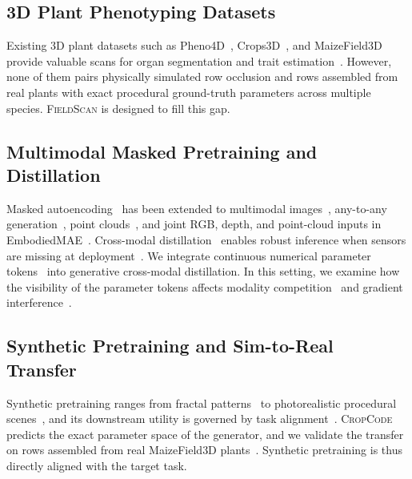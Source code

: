 \documentclass[10pt,twocolumn,letterpaper]{article}
\newcommand{\method}{\textup{\textsc{CropCode}}}   %
\newcommand{\dataset}{\textup{\textsc{FieldScan}}}
\begin{document}
\subsection{3D Plant Phenotyping Datasets}
Existing 3D plant datasets such as Pheno4D~\citep{schunck2021pheno4d}, Crops3D~\citep{crops3d2024}, and MaizeField3D~\citep{maizefield3d2025} provide valuable scans for organ segmentation and trait estimation~\citep{qi2017pointnet,qi2017pointnetpp,arshad2024nerf_field}. However, none of them pairs physically simulated row occlusion and rows assembled from real plants with exact procedural ground-truth parameters across multiple species. \dataset{} is designed to fill this gap.

\subsection{Multimodal Masked Pretraining and Distillation}
Masked autoencoding~\citep{he2022mae} has been extended to multimodal images~\citep{bachmann2022multimae}, any-to-any generation~\citep{mizrahi2023fourm,bachmann2024fourm21}, point clouds~\citep{pang2022pointmae}, and joint RGB, depth, and point-cloud inputs in EmbodiedMAE~\citep{dong2025embodiedmae}. Cross-modal distillation~\citep{hinton2015distillation} enables robust inference when sensors are missing at deployment~\citep{wang2024robustmissing}. We integrate continuous numerical parameter tokens~\citep{golkar2023xval} into generative cross-modal distillation. In this setting, we examine how the visibility of the parameter tokens affects modality competition~\citep{peng2022ogm} and gradient interference~\citep{yu2020pcgrad,chen2018gradnorm}.

\subsection{Synthetic Pretraining and Sim-to-Real Transfer}
Synthetic pretraining ranges from fractal patterns~\citep{kataoka2020fractaldb} to photorealistic procedural scenes~\citep{raistrick2023infinigen,greff2022kubric,tobin2017domainrand}, and its downstream utility is governed by task alignment~\citep{fan2023intriguing,alemohammad2023mad}. \method{} predicts the exact parameter space of the generator, and we validate the transfer on rows assembled from real MaizeField3D plants~\citep{maizefield3d2025}. Synthetic pretraining is thus directly aligned with the target task.
\end{document}
